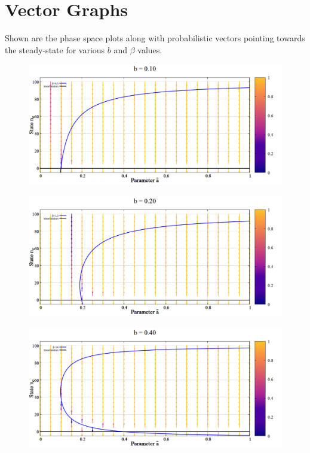 \chapter{Vector Graphs}
\label{apndx:vectgraph}
Shown are the phase space plots along with probabilistic vectors pointing towards the steady-state for various $b$ and $\beta$ values.

\begin{figure}[h!]
 \centering
  \includegraphics[width=\linewidth]{images/appendix/vectors/1.png}
\end{figure}

\begin{figure}[h!]
 \centering
  \includegraphics[width=\linewidth]{images/appendix/vectors/2.png}
\end{figure}

\begin{figure}[h!]
 \centering
  \includegraphics[width=\linewidth]{images/appendix/vectors/3.png}
\end{figure}

